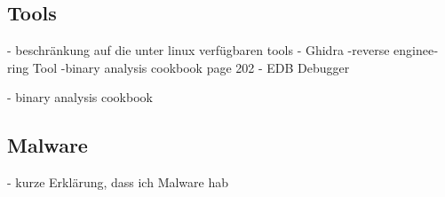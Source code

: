 \begin{otherlanguage}{ngerman}
\subsection{Tools}
- beschränkung auf die unter linux verfügbaren tools
\newline
- Ghidra
\newline
-reverse engineering Tool
\newline
-binary analysis cookbook page 202
\newline
- EDB Debugger




\newline 
- binary analysis cookbook  
\subsection{Malware}
- kurze Erklärung, dass ich Malware hab
\newpage
\end{otherlanguage}